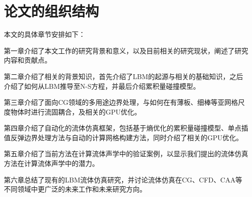\section{论文的组织结构}
本文的具体章节安排如下：

第一章介绍了本文工作的研究背景和意义，以及目前相关的研究现状，阐述了研究内容和贡献点。

第二章介绍了相关的背景知识，首先介绍了LBM的起源与相关的基础知识，之后介绍了如何从LBM推导至N-S方程，并最后介绍累积量碰撞模型。

第三章介绍了面向CG领域的多用途边界处理，与如何在有薄板、细棒等亚网格尺度物体时进行流固耦合，及相关的GPU优化。

第四章介绍了自动化的流体仿真框架，包括基于熵优化的累积量碰撞模型、单点插值反弹边界处理方法与自动的计算网格构建方法，同时介绍了相关的GPU优化。

第五章介绍了当前方法在计算流体声学中的验证案例，以显示我们提出的流体仿真方法在计算流体声学中的潜力。

第六章总结了现有的LBM流体仿真研究，并讨论流体仿真在CG、CFD、CAA等不同领域中更广泛的未来工作和未来研究方向。